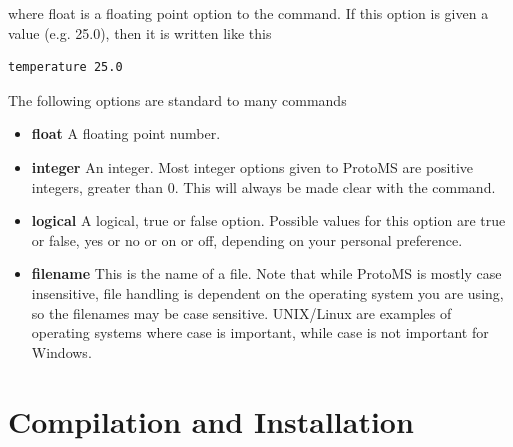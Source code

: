 \documentclass[letterpaper,10pt,english]{manual}
\begin{document}
where float is a floating point option to the command. If this option is given a value (e.g. 25.0), then it is written like this

\begin{Verbatim}[commandchars=@\[\]]
temperature 25.0
\end{Verbatim}

The following options are standard to many commands
\begin{itemize}
\item {} 
\textbf{float} A floating point number.

\item {} 
\textbf{integer} An integer. Most integer options given to ProtoMS are positive integers, greater than 0. This will always be made clear with the command.

\item {} 
\textbf{logical} A logical, true or false option. Possible values for this option are true or false, yes or no or on or off, depending on your personal preference.

\item {} 
\textbf{filename} This is the name of a file. Note that while ProtoMS is mostly case insensitive, file handling is dependent on the operating system you are using, so the filenames may be case sensitive. UNIX/Linux are examples of operating systems where case is important, while case is not important for Windows.

\end{itemize}

\resetcurrentobjects
\hypertarget{--doc-compilation}{}

\chapter{Compilation and Installation}
\end{document}
